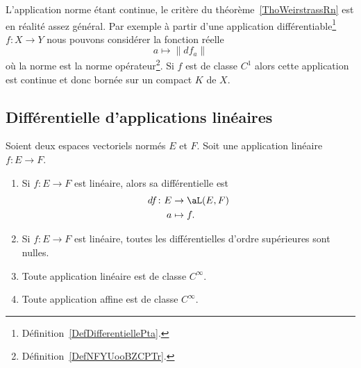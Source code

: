 \begin{remark}      \label{RemATQVooDnZBbs}
	L'application norme étant continue, le critère du théorème~\ref{ThoWeirstrassRn} est en réalité assez général. Par exemple à partir d'une application différentiable\footnote{Définition~\ref{DefDifferentiellePta}.} \( f\colon X\to Y\)  nous pouvons considérer la fonction réelle
	\begin{equation}
		a\mapsto \|  df_a   \|
	\end{equation}
	où la norme est la norme opérateur\footnote{Définition~\ref{DefNFYUooBZCPTr}.}. Si \( f\) est de classe \( C^1\) alors cette application est continue et donc bornée sur un compact \( K\) de \( X\).
\end{remark}


\subsection{Différentielle d'applications linéaires}

\begin{lemma}       \label{LEMooZSNMooCfjzOB}
	Soient deux espaces vectoriels normés \( E\) et \( F\). Soit une application linéaire \( f\colon E\to F\).
	\begin{enumerate}
		\item
		      Si \( f\colon E\to F\) est linéaire, alors sa différentielle est
		      \begin{equation}
			      \begin{aligned}
				      df\colon E & \to  \aL(E,F) \\
				      a          & \mapsto f.
			      \end{aligned}
		      \end{equation}
		\item
		      Si \( f\colon E\to F\) est linéaire, toutes les différentielles d'ordre supérieures sont nulles.
		\item
		      Toute application linéaire est de classe \(  C^{\infty}\).
		\item
		      Toute application affine est de classe \(  C^{\infty}\).
	\end{enumerate}
\end{lemma}

